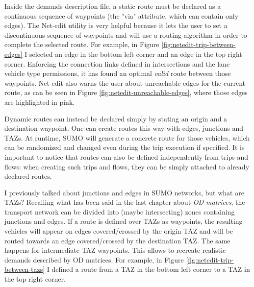 Inside the demands description file, a static route must be declared as a continuous sequence of waypoints (the "via" attribute, which can contain only edges). The Net-edit utility is very helpful because it lets the user to set a discontinuous sequence of waypoints and will use a routing algorithm in order to complete the selected route. For example, in Figure \ref{fig:netedit-trip-between-edges} I selected an edge in the bottom left corner and an edge in the top right corner. Enforcing the connection links defined in intersections and the lane vehicle type permissions, it has found an optimal \textit{valid} route between those waypoints. Net-edit also warns the user about unreachable edges for the current route, as can be seen in Figure \ref{fig:netedit-unreachable-edges}, where those edges are highlighted in pink.


Dynamic routes can instead be declared simply by stating an origin and a destination waypoint. One can create routes this way with edges, junctions and TAZs. At runtime, SUMO will generate a concrete route for those vehicles, which can be randomized and changed even during the trip execution if specified. It is important to notice that routes can also be defined independently from trips and flows: when creating such trips and flows, they can be simply attached to already declared routes.

I previously talked about junctions and edges in SUMO networks, but what are TAZs? Recalling what has been said in the last chapter about \textit{OD matrices}, the transport network can be divided into (maybe intersecting) zones containing junctions and edges. If a route is defined over TAZs as waypoints, the resulting vehicles will appear on edges covered/crossed by the origin TAZ and will be routed towards an edge covered/crossed by the destination TAZ. The same happens for intermediate TAZ waypoints. This allows to recreate realistic demands described by OD matrices. For example, in Figure \ref{fig:netedit-trip-between-tazs} I defined a route from a TAZ in the bottom left corner to a TAZ in the top right corner.


